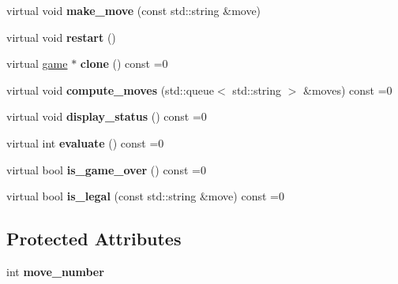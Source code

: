 \begin{DoxyCompactItemize}
\mbox{\label{classmain__savitch__14_1_1game_a20597d0caa907aea47b27fed8be3759b}} 
virtual void {\bfseries make\+\_\+move} (const std\+::string \&move)
\item 
\mbox{\label{classmain__savitch__14_1_1game_ad521a7d78e7c163a0bc28b709f0d45fd}} 
virtual void {\bfseries restart} ()
\item 
\mbox{\label{classmain__savitch__14_1_1game_a7b663057f59210dd52738facfc40d959}} 
virtual \mbox{\hyperlink{classmain__savitch__14_1_1game}{game}} $\ast$ {\bfseries clone} () const =0
\item 
\mbox{\label{classmain__savitch__14_1_1game_a2c0c049f5861026d0f639b5837889b7a}} 
virtual void {\bfseries compute\+\_\+moves} (std\+::queue$<$ std\+::string $>$ \&moves) const =0
\item 
\mbox{\label{classmain__savitch__14_1_1game_ac8205178922c49bab2865187e834b726}} 
virtual void {\bfseries display\+\_\+status} () const =0
\item 
\mbox{\label{classmain__savitch__14_1_1game_a9b9c8c5e9aa57c9a430f20b87cb047aa}} 
virtual int {\bfseries evaluate} () const =0
\item 
\mbox{\label{classmain__savitch__14_1_1game_a49eed20648918b03fd3e2cf78987b3d1}} 
virtual bool {\bfseries is\+\_\+game\+\_\+over} () const =0
\item 
\mbox{\label{classmain__savitch__14_1_1game_ad38351422ca1ee3ae58440c1c6b36b30}} 
virtual bool {\bfseries is\+\_\+legal} (const std\+::string \&move) const =0
\end{DoxyCompactItemize}
\subsection*{Protected Attributes}
\begin{DoxyCompactItemize}
\item 
\mbox{\label{classmain__savitch__14_1_1game_ac4c296f4370d8e5bb5ea74b638fb827d}} 
int {\bfseries move\+\_\+number}
\end{DoxyCompactItemize}



